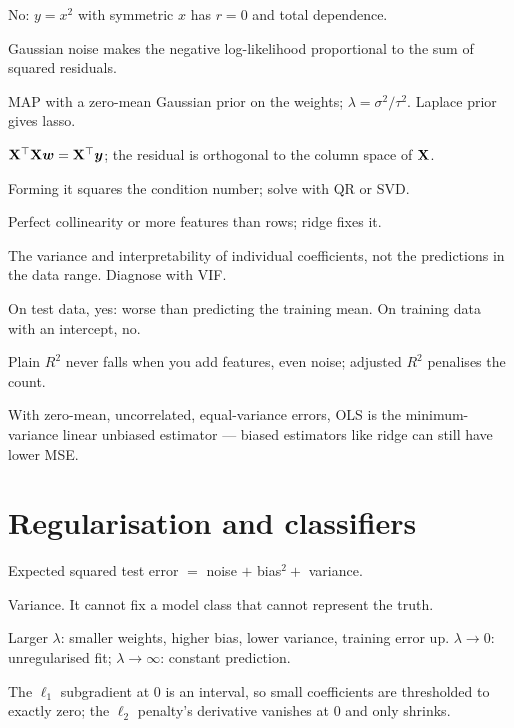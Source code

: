 {	 No: $y=x^2$ with symmetric $x$ has $r=0$ and total dependence.

	 Gaussian noise makes the negative log-likelihood proportional to the sum of squared
	residuals.

	 MAP with a zero-mean Gaussian prior on the weights; $\lambda=\sigma^2/\tau^2$. Laplace prior
	gives lasso.

	 ${\mathbf{X}}^{\top}{\mathbf{X}}{\bm{w}}={\mathbf{X}}^{\top}{\bm{y}}$; the residual is orthogonal to the column space of ${\mathbf{X}}$.

	 Forming it squares the condition number; solve with QR or SVD.

	 Perfect collinearity or more features than rows; ridge fixes it.

	 The variance and interpretability of individual coefficients, not the
	predictions in the data range. Diagnose with VIF.

	 On test data, yes: worse than predicting the training mean. On training data with an
	intercept, no.

	 Plain $R^2$ never falls when you add features, even noise; adjusted $R^2$ penalises the
	count.

	 With zero-mean, uncorrelated, equal-variance errors, OLS is the minimum-variance
	linear unbiased estimator --- biased estimators like ridge can still have lower MSE.

	\section{Regularisation and classifiers}

	 Expected squared test error $=$ noise $+$ bias$^2+$ variance.

	 Variance. It cannot fix a model class that cannot represent the truth.

	 Larger $\lambda$: smaller weights, higher bias, lower variance,
	training error up. $\lambda\to0$: unregularised fit; $\lambda\to\infty$: constant prediction.

	 The $\ell_1$ subgradient at $0$ is an interval, so small
	coefficients are thresholded to exactly zero; the $\ell_2$ penalty's derivative vanishes at $0$ and only shrinks.

}
